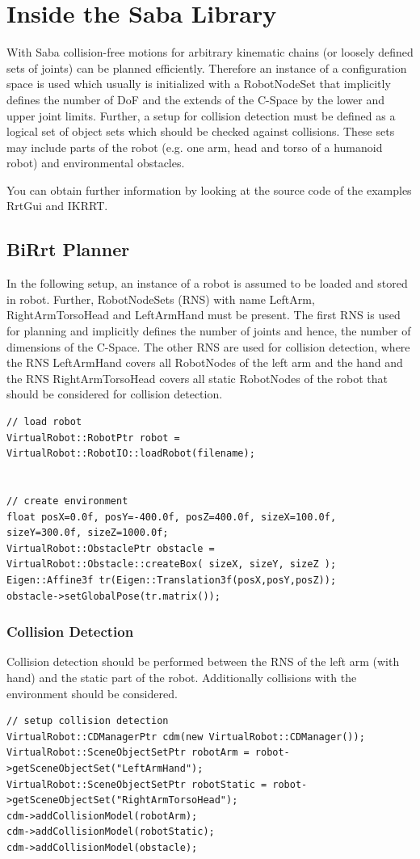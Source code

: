\documentclass{book}
\begin{document}
\chapter{Inside the Saba Library}
With Saba collision-free motions for arbitrary kinematic chains (or loosely defined sets of joints) can be planned efficiently. Therefore an instance of a configuration space is used which usually is initialized with a RobotNodeSet that implicitly defines the number of DoF and the extends of the C-Space by the lower and upper joint limits. Further, a setup for collision detection must be defined as a logical set of object sets which should be checked against collisions. These sets may include parts of the robot (e.g. one arm, head and torso of a humanoid robot) and environmental obstacles.
\par
You can obtain further information by looking at the source code of the examples RrtGui and IKRRT. 
\section{BiRrt Planner}
In the following setup, an instance of a robot is assumed to be loaded and stored in robot. Further, RobotNodeSets (RNS) with name LeftArm, RightArmTorsoHead and LeftArmHand must be present. The first RNS is used for planning and implicitly defines the number of joints and hence, the number of dimensions of the C-Space. The other RNS are used for collision detection, where the RNS LeftArmHand covers all RobotNodes of the left arm and the hand and the RNS RightArmTorsoHead covers all static RobotNodes of the robot that should be considered for collision detection. 
\begin{lstlisting}
// load robot
VirtualRobot::RobotPtr robot = VirtualRobot::RobotIO::loadRobot(filename);


// create environment
float posX=0.0f, posY=-400.0f, posZ=400.0f, sizeX=100.0f, sizeY=300.0f, sizeZ=1000.0f;
VirtualRobot::ObstaclePtr obstacle = VirtualRobot::Obstacle::createBox( sizeX, sizeY, sizeZ );
Eigen::Affine3f tr(Eigen::Translation3f(posX,posY,posZ));
obstacle->setGlobalPose(tr.matrix());
\end{lstlisting}
\subsection{Collision Detection}
Collision detection should be performed between the RNS of the left arm (with hand) and the static part of the robot. Additionally collisions with the environment should be considered. 
\begin{lstlisting}
// setup collision detection
VirtualRobot::CDManagerPtr cdm(new VirtualRobot::CDManager());
VirtualRobot::SceneObjectSetPtr robotArm = robot->getSceneObjectSet("LeftArmHand");
VirtualRobot::SceneObjectSetPtr robotStatic = robot->getSceneObjectSet("RightArmTorsoHead");
cdm->addCollisionModel(robotArm);
cdm->addCollisionModel(robotStatic);
cdm->addCollisionModel(obstacle);
\end{lstlisting}
\end{document}
